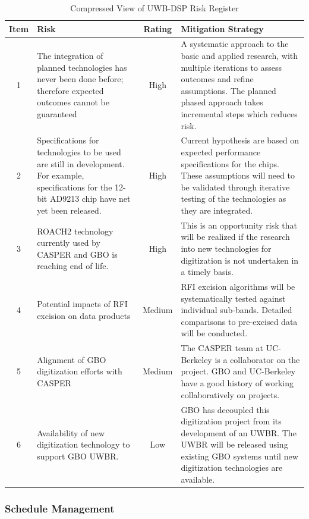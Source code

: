 \documentclass[10pt]{myNSF}
\begin{document}
\begin{table}[t]
  \centering
  \caption{Compressed View of UWB-DSP Risk Register \label{table:risk_register}}
  \begin{tabular}{|c|p{2.5in}|c|p{2.5in}|}
    \hline
    Item & Risk & Rating & Mitigation Strategy \\
    \hline
    1 & The integration of planned technologies has never been done before; therefore expected outcomes cannot be guaranteed & High & A systematic approach to the basic and applied research, with multiple iterations to assess outcomes and refine assumptions.  The planned phased approach takes incremental steps which reduces risk. \\
    \hline
    2 & Specifications for technologies to be used are still in development.  For example, specifications for the 12-bit AD9213 chip have net yet been released. & High & Current hypothesis are based on expected performance specifications for the chips.  These assumptions will need to be validated through iterative testing of the technologies as they are integrated. \\
    \hline
    3 & ROACH2 technology currently used by CASPER and GBO is reaching end of life. & High & This is an opportunity risk that will be realized if the research into new technologies for digitization is not undertaken in a timely basis. \\
    \hline
    4 & Potential impacts of RFI excision on data products & Medium & RFI excision algorithms will be systematically tested against individual sub-bands.  Detailed comparisons to pre-excised data will be conducted. \\
    \hline
    5 & Alignment of GBO digitization efforts with CASPER & Medium & The CASPER team at UC-Berkeley is a collaborator on the project.  GBO and UC-Berkeley have a good history of working collaboratively on projects. \\
    \hline
    6 & Availability of new digitization technology to support GBO UWBR. & Low & GBO has decoupled this digitization project from its development of an UWBR.  The UWBR will be released using existing GBO systems until new digitization technologies are available. \\
    \hline
  \end{tabular}
\end{table}

\subsubsection{Schedule Management}
\label{sec:schedule}
\end{document}
